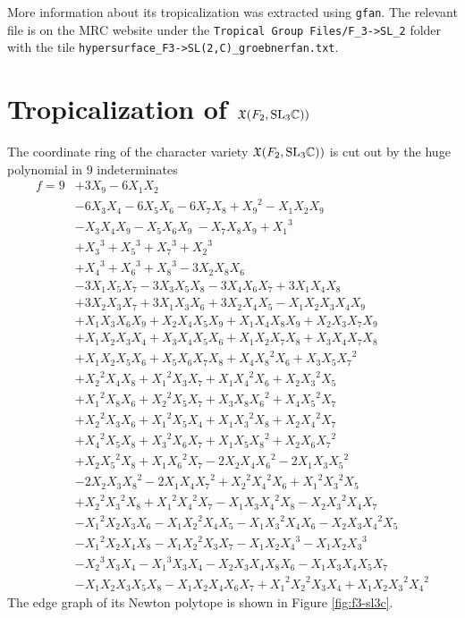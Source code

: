 \documentclass[11pt]{article}
\begin{document}
More information about its tropicalization was extracted using
\texttt{gfan}. The relevant file is on the MRC website under the
\texttt{Tropical Group Files/F\_3->SL\_2} folder with the tile
\texttt{hypersurface\_F3->SL(2,C)\_groebnerfan.txt}.

\section{Tropicalization of  $\mathfrak{X}(F_2, \mathrm{SL}_3\mathbb{C}))$}
The coordinate ring of the character variety $\mathfrak{X}(F_2, \mathrm{SL}_3\mathbb{C}))$ is
cut out by the huge polynomial in $9$ indeterminates
\begin{equation}
  \label{eq:f2-sl3c}
  \begin{aligned}
    f=9&+3X_9 - 6X_1X_2\\
    &-6X_3X_4-6X_5X_6-6X_7X_8 + {X_9}^2- X_1X_2X_9\\
    & - X_3X_4X_9 - X_5X_6X_9\ - X_7X_8X_9+{X_1}^3\\
    &+ {X_3}^3 + {X_5}^3 + {X_7}^3 + {X_2}^3 \\
    &+ {X_4}^3 + {X_6}^3 + {X_8}^3 - 3X_2X_8X_6\\
    &- 3X_1X_5X_7 - 3X_3X_5X_8-3X_4X_6X_7 + 3X_1X_4X_8\\
    &+ 3X_2X_3X_7 + 3X_1X_3X_6 + 3X_2X_4X_5 - X_1X_2X_3X_4X_9\\
    &+ X_1X_3X_6X_9 + X_2X_4X_5X_9 + X_1X_4X_8X_9+X_2X_3X_7X_9\\
    &+ X_1X_2X_3X_4 + X_3X_4X_5X_6+ X_1X_2X_7X_8 + X_3X_4X_7X_8\\
    &+ X_1X_2X_5X_6+ X_5X_6X_7X_8 + X_4{X_8}^2X_6 + X_3X_5{X_7}^2\\
    &+ {X_2}^2X_4X_8 + {X_1}^2X_3X_7 + X_1{X_4}^2X_6 + X_2{X_3}^2X_5\\
    &+ {X_1}^2X_8X_6 + {X_2}^2X_5X_7+ X_3X_8{X_6}^2 + X_4{X_5}^2X_7 \\
    &+ {X_2}^2X_3X_6 + {X_1}^2X_5X_4 + X_1{X_3}^2X_8 + X_2{X_4}^2X_7\\
    &+ {X_4}^2X_5X_8 + {X_3}^2X_6X_7+ X_1X_5{X_8}^2 + X_2X_6{X_7}^2 \\
    &+ X_2{X_5}^2X_8 + X_1{X_6}^2X_7 - 2X_2X_4{X_6}^2 - 2X_1X_3{X_5}^2\\
    &- 2X_2X_3{X_8}^2 - 2X_1X_4{X_7}^2+ {X_2}^2{X_4}^2X_6 +
    {X_1}^2{X_3}^2X_5\\
    &+ {X_2}^2{X_3}^2X_8 + {X_1}^2{X_4}^2X_7- X_1X_3{X_4}^2X_8 -
    X_2{X_3}^2X_4X_7\\
    &- {X_1}^2X_2X_3X_6 - X_1{X_2}^2X_4X_5- X_1{X_3}^2X_4X_6 -
    X_2X_3{X_4}^2X_5\\
    &- {X_1}^2X_2X_4X_8- X_1{X_2}^2X_3X_7 - X_1X_2{X_4}^3 - X_1X_2{X_3}^3\\
    &- {X_2}^3X_3X_4 - {X_1}^3X_3X_4- X_2X_3X_4X_8X_6 - X_1X_3X_4X_5X_7\\
    & - X_1X_2X_3X_5X_8- X_1X_2X_4X_6X_7 + {X_1}^2{X_2}^2X_3X_4 +
    X_1X_2{X_3}^2{X_4}^2
  \end{aligned}
\end{equation}
The edge graph of its Newton polytope is shown in Figure \ref{fig:f3-sl3c}.
\end{document}
